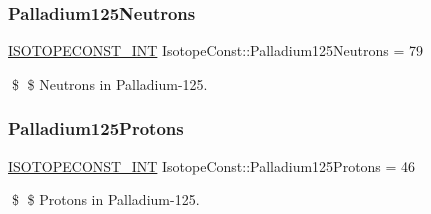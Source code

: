 \subsubsection{\texorpdfstring{Palladium125\+Neutrons}{Palladium125Neutrons}}
{\footnotesize\ttfamily \mbox{\hyperlink{group___isotope_const-_macros_ga5f18360b3e99483a35c32d789e62621c}{I\+S\+O\+T\+O\+P\+E\+C\+O\+N\+S\+T\+\_\+\+I\+NT}} Isotope\+Const\+::\+Palladium125\+Neutrons = 79}

\$ \$ Neutrons in Palladium-\/125. \mbox{\label{group___isotope_const-_palladium-_pd125_ga6512b73574efebc86f178753179361d2}} 
\subsubsection{\texorpdfstring{Palladium125\+Protons}{Palladium125Protons}}
{\footnotesize\ttfamily \mbox{\hyperlink{group___isotope_const-_macros_ga5f18360b3e99483a35c32d789e62621c}{I\+S\+O\+T\+O\+P\+E\+C\+O\+N\+S\+T\+\_\+\+I\+NT}} Isotope\+Const\+::\+Palladium125\+Protons = 46}

\$ \$ Protons in Palladium-\/125. 